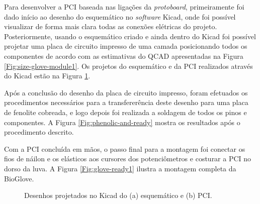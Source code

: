 \documentclass[
	12pt,				%
	openright,			%
	oneside,			%
	a4paper,			%
	english,			%
	brazil				%
	]{abntex2}
\begin{document}
			Para desenvolver a PCI baseada nas ligações da \textit{protoboard}, primeiramente foi dado início ao desenho do esquemático no \textit{software} Kicad, onde foi possível visualizar de forma mais clara todas as conexões elétricas do projeto. Posteriormente, usando o esquemático criado e ainda dentro do Kicad foi possível projetar uma placa de circuito impresso de uma camada posicionando todos os componentes de acordo com as estimativas do QCAD apresentadas na Figura \ref{Fig:size-glove-module1}. Os projetos do esquemático e da PCI realizados através do Kicad estão na Figura \ref{Fig:schematic-and-PCB}.

			Após a conclusão do desenho da placa de circuito impresso, foram efetuados os procedimentos necessários para a transfererência deste desenho para uma placa de fenolite cobreada, e logo depois foi realizada a soldagem de todos os pinos e componentes. A Figura \ref{Fig:phenolic-and-ready} mostra os resultados após o procedimento descrito. 
		
		Com a PCI concluída em mãos, o passo final para a montagem foi conectar os fios de náilon e os elásticos aos cursores dos potenciômetros e costurar a PCI no dorso da luva. A Figura \ref{Fig:glove-ready1} ilustra a montagem completa da BioGlove.

	\begin{figure}[!htb]
		 \centering
		 \caption{ Desenhos projetados no Kicad do (a) esquemático e (b) PCI. }
		 \centering
		 \label{Fig:schematic-and-PCB}
	\end{figure}
\end{document}

